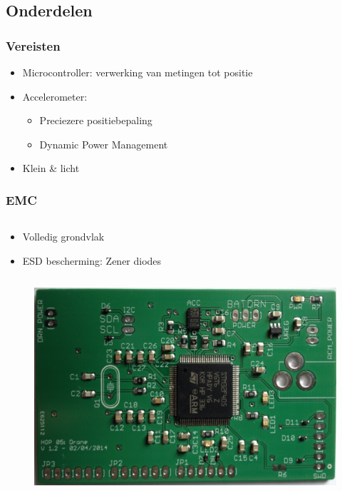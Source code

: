 \documentclass{beamer}
\begin{document}
\subsection{Onderdelen}
  \begin{frame}
    \frametitle{Vereisten}
    \begin{itemize}
      \item Microcontroller: verwerking van metingen tot positie
      \item Accelerometer:
      \begin{itemize}
      	\item Preciezere positiebepaling
      	\item Dynamic Power Management
      \end{itemize}
      \item Klein \& licht
    \end{itemize}
  \end{frame}
  \begin{frame}
  	\frametitle{EMC}
      \begin{columns}[t]
        \begin{column}[T]{.5\textwidth}
          \begin{itemize}
            \item Volledig grondvlak
            \item ESD bescherming: Zener diodes
          \end{itemize}
        \end{column}
        \begin{column}[T]{.5\textwidth}
          \centering
        \end{column}
      \end{columns}
  \end{frame}
  \begin{frame}
    \begin{figure}
      \begin{center}
        \includegraphics[width=\textwidth]{images/final.eps}
      \end{center}
    \end{figure}
  \end{frame}
\end{document}
